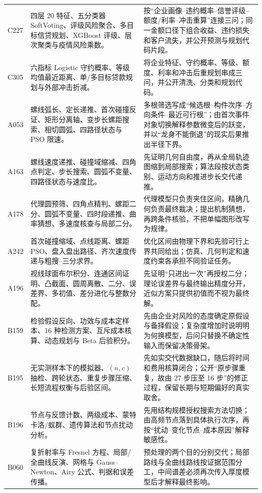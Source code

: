 \begin{longtable}{p{1.4cm}p{5.2cm}p{7.0cm}}
C227 & 四层 20 特征、五分类器 SoftVoting、评级风险聚合、多目标信贷规划、XGBoost 评级、层次聚类与疫情风险乘数。 &
按“企业画像--违约概率--信誉评级--额度/利率--冲击重算”连接三问；同一金额口径下组合收益、违约损失和客户流失，并公开预测与规划代码片段。\\
C305 & 六指标 Logistic 守约概率、等级均值最近距离、单/多目标贷款规划与外部冲击折减。 &
将企业特征、守约概率、等级、额度、利率和冲击后重规划串成三问，并公开清洗、分类和规划代码。\\
A053 & 螺线弧长、定长递推、首次碰撞反证、矩形分离轴、变步长螺距搜索、相切圆弧、四路径状态与 PSO 限速。 &
多根筛选写成“候选根--构件次序--方向条件--最近可行根”；由首次事件对象切换解释参数微变后的跃变，并以“龙身不能倒退”的现实后果推出半径下界。\\
A163 & 螺线速度递推、碰撞域缩减、四角点判定、步长搜索、圆弧不变量、四路径状态与速度比。 &
先证明几何自由度，再从全局轨迹图缩到局部搜索；算法段按状态类别、运动方向和推进步长交代递推。\\
A178 & 代理圆预筛、四角点精判、螺距二分、圆弧不变量、四时段递推、曲率猜想、多速度核查与局部二分。 &
代理模型只负责夹住区间，精确几何负责最终裁决；提出机制猜想，再跨条件核验，不把单幅图形改写为规律。\\
A242 & 首次碰撞缩域、点线距离、螺距 PSO、盘入盘出路径、齐次速度传递与粗搜--三分求界。 &
优化区间由物理下界和先验可行上界共同给出；仿真、几何判定和速度约束各承担不同验证任务。\\
A196 & 视线球面布尔积分、连通区间证明、凸截面、圆周离散、二分、误差界、多初值、差分进化与整数分配。 &
先证明“只进出一次”再授权二分；理论误差界与最终输出精度分开，近似方案只提供初值而不视为最终解。\\
B159 & 检验假设反向、功效与成本定样本、16 种检测方案、互斥成本核算、动态规划与 Beta 后验积分。 &
先由企业对风险的态度确定原假设与备择假设；复杂度增加时说明明为何换模型，后问只替换不确定性输入而保留决策骨架。\\
B195 & 无实测样本下的模拟器、$(n,c)$ 抽检、跨轮状态、重复步骤压缩、长短流程权衡与后验区间。 &
先如实交代数据缺口，随后将时间和费用核算闭合；公开“原步骤重复，故由 27 步压至 16 步”的修正过程，保留长期与短期偏好的真实取舍。\\
B196 & 节点与反馈计数、两级成本、蒙特卡洛/蚁群、遗传算法和节点扰动分析。 &
先用结构规模授权搜索方法切换；由高频节点落到具体执行次序，再按“扰动--变化节点--成本原因”解释敏感性。\\
B060 & 复折射率与 Fresnel 方程、局部/全曲线反演、网格与 Gauss--Newton、Airy 公式、判据和误差传播。 &
预处理的两个目的分别交代；局部路线与全曲线路线按证据范围分工，中间谱差必须再次传入厚度模型后才解释最终影响。\\

\end{longtable}
